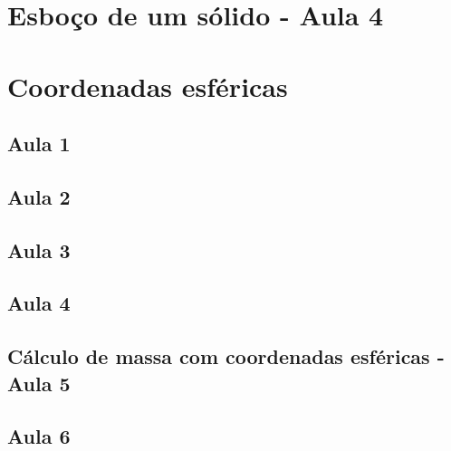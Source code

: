 \documentclass[12pt, a4paper]{article}
\begin{document}
		\section{Esboço de um sólido - Aula 4}
				
		\section{Coordenadas esféricas}
			\subsection{Aula 1}
							
			\subsection{Aula 2}
							
			\subsection{Aula 3}
				
			\subsection{Aula 4}
							
			\subsection[Aula 5]{Cálculo de massa com coordenadas esféricas - Aula 5}
						
			\subsection{Aula 6}
				
	
			
			
\end{document}
